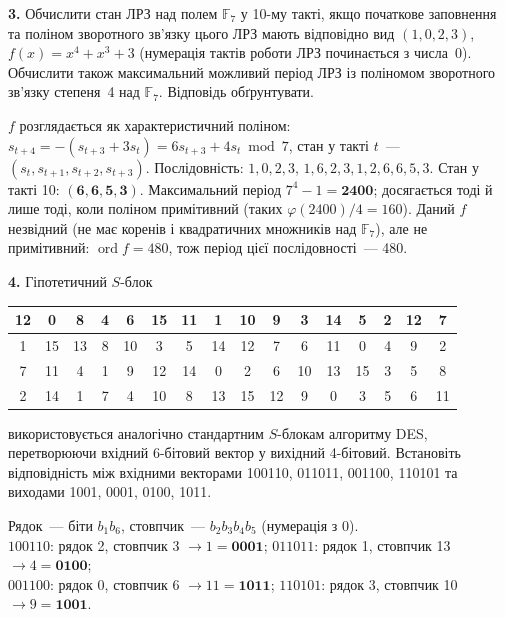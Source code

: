 \documentclass[12pt,a4paper]{article}
\newcommand{\F}{\mathbb{F}}
\begin{document}
\medskip
\textbf{3.} Обчислити стан ЛРЗ над полем $\F_7$ у 10-му такті, якщо початкове
заповнення та поліном зворотного зв'язку цього ЛРЗ мають відповідно вид
$(1,0,2,3)$, \ $f(x)=x^4+x^3+3$ (нумерація тактів роботи ЛРЗ починається з
числа~0). Обчислити також максимальний можливий період ЛРЗ із поліномом
зворотного зв'язку степеня~4 над $\F_7$. Відповідь обґрунтувати.

\begin{answer}
$f$ розглядається як характеристичний поліном:
$s_{t+4}=-(s_{t+3}+3s_t)=6s_{t+3}+4s_t \bmod 7$, стан у такті $t$~---
$(s_t,s_{t+1},s_{t+2},s_{t+3})$.
Послідовність: $1,0,2,3,\,1,6,2,3,1,2,6,6,5,3$.
Стан у такті 10: $\mathbf{(6,6,5,3)}$.
Максимальний період $7^4-1=\mathbf{2400}$; досягається тоді й лише тоді, коли
поліном примітивний (таких $\varphi(2400)/4=160$).
Даний $f$ незвідний (не має коренів і квадратичних множників над $\F_7$), але не
примітивний: $\operatorname{ord} f=480$, тож період цієї послідовності~--- 480.
\end{answer}

\medskip
\textbf{4.} Гіпотетичний $S$-блок

\smallskip
{\setlength{\tabcolsep}{4pt}
\begin{tabular}{|*{16}{c|}}
\hline
12&0&8&4&6&15&11&1&10&9&3&14&5&2&12&7\\ \hline
1&15&13&8&10&3&5&14&12&7&6&11&0&4&9&2\\ \hline
7&11&4&1&9&12&14&0&2&6&10&13&15&3&5&8\\ \hline
2&14&1&7&4&10&8&13&15&12&9&0&3&5&6&11\\ \hline
\end{tabular}}

\smallskip
використовується аналогічно стандартним $S$-блокам алгоритму DES, перетворюючи
вхідний 6-бітовий вектор у вихідний 4-бітовий. Встановіть відповідність між
вхідними векторами 100110, 011011, 001100, 110101 та виходами 1001, 0001, 0100,
1011.

\begin{answer}
Рядок~--- біти $b_1b_6$, стовпчик~--- $b_2b_3b_4b_5$ (нумерація з 0).\\
$100110$: рядок 2, стовпчик 3 $\to 1=\mathbf{0001}$;\quad
$011011$: рядок 1, стовпчик 13 $\to 4=\mathbf{0100}$;\\
$001100$: рядок 0, стовпчик 6 $\to 11=\mathbf{1011}$;\quad
$110101$: рядок 3, стовпчик 10 $\to 9=\mathbf{1001}$.
\end{answer}
\end{document}
